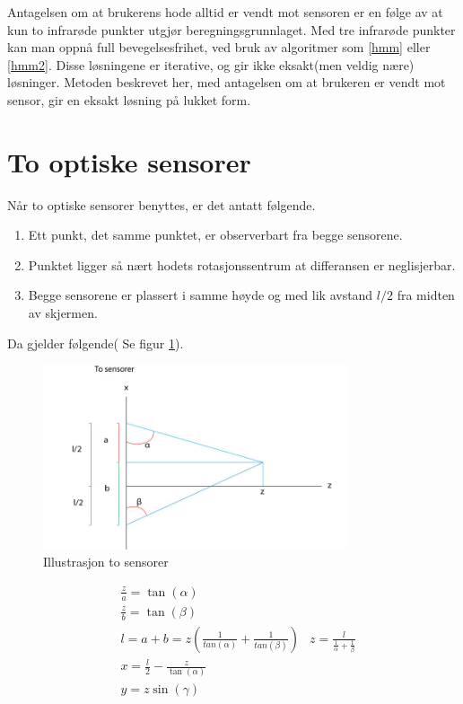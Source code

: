 \documentclass{report}
\begin{document}
Antagelsen om at brukerens hode alltid er vendt mot sensoren er en følge av at kun to infrarøde punkter
utgjør beregningsgrunnlaget. Med tre infrarøde punkter kan man oppnå full bevegelsesfrihet, ved bruk
av algoritmer som \ref{hmm} eller \ref{hmm2}. Disse løsningene er iterative, og gir ikke eksakt(men veldig nære) løsninger.
Metoden beskrevet her, med antagelsen om at brukeren er vendt mot sensor, gir en eksakt løsning på lukket form.

\section{To optiske sensorer}

Når to optiske sensorer benyttes, er det antatt følgende.
\begin{enumerate}
\item Ett punkt, det samme punktet, er observerbart fra begge sensorene. 
\item Punktet ligger så nært hodets rotasjonssentrum at differansen er neglisjerbar.
\item Begge sensorene er plassert i samme høyde og med lik avstand $l/2$ fra midten av skjermen.
\end{enumerate}

Da gjelder følgende( Se figur \ref{fig:Figur_to_sensorer}).
	\begin{figure}[h]
	\centering
	\includegraphics[width=0.80\textwidth]{graphics/Figur_2_sensorer.jpg}
	\caption{Illustrasjon to sensorer}
	\label{fig:Figur_to_sensorer}
	\end{figure}
\begin{eqnarray}\label{definition2}
&\frac{z}{a} = \tan( \alpha )\\
&\frac{z}{b} = \tan( \beta )\\
&l = a + b = z(\frac{1}{tan( \alpha )} + \frac{1}{tan( \beta )})
&z = \frac{l}{\frac{1}{\alpha} + \frac{1}{\beta}}\\
&x = \frac{l}{2} - \frac{z}{\tan( \alpha )}\\
&y = z\sin( \gamma )
\end{eqnarray}
\end{document}
